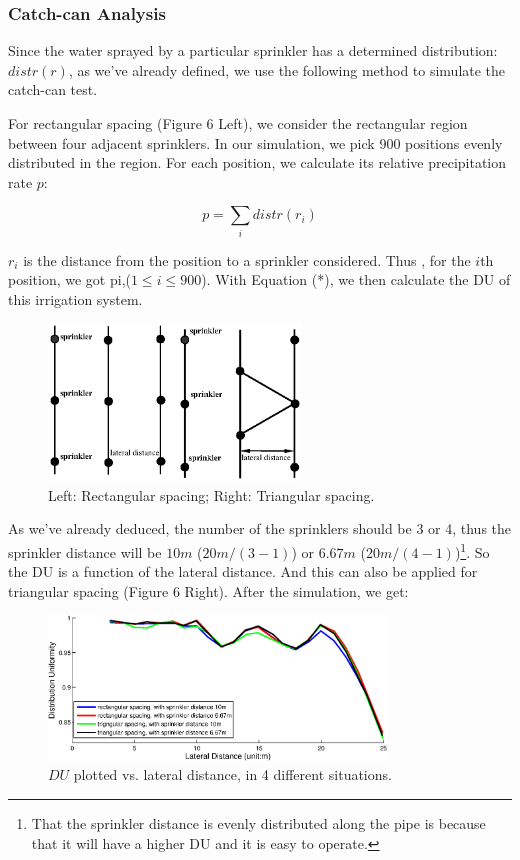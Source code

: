 \documentclass[12pt,a4paper,titlepage]{article}
\begin{document}
\subsubsection{Catch-can Analysis}

Since the water sprayed by a particular sprinkler has a determined
distribution: $distr(r)$, as we've already defined, we use the
following method to simulate the catch-can test.

For rectangular spacing (Figure 6 Left), we consider the
rectangular region between four adjacent sprinklers. In our
simulation, we pick 900 positions evenly distributed in the
region. For each position, we calculate its relative precipitation
rate $p$:

\[
p=\sum_idistr(r_i)
\]

$r_i$ is the distance from the position to a sprinkler considered.
Thus , for the $i$th position, we got pi,($1\leq i\leq900$). With
Equation (*), we then calculate the DU of this irrigation system.

\begin{figure}[!htb]
\centering
\includegraphics[width=0.6\textwidth]{fig06.eps}
\caption{\label{fig06} Left: Rectangular spacing; Right:
Triangular spacing.}
\end{figure}

As we've already deduced, the number of the sprinklers should be 3
or 4, thus the sprinkler distance will be $10m$ ($20m/(3-1)$) or
$6.67m$ ($20m/(4-1)$)\footnote{That the sprinkler distance is
evenly distributed along the pipe is because that it will have a
higher DU and it is easy to operate.}. So the DU is a function of
the lateral distance. And this can also be applied for triangular
spacing (Figure 6 Right). After the simulation, we get:

\begin{figure}[!htb]
\centering
\includegraphics[width=0.8\textwidth]{fig07.eps} \caption{\label{fig07} $DU$ plotted vs.
lateral distance, in 4 different situations.}
\end{figure}
\end{document}
